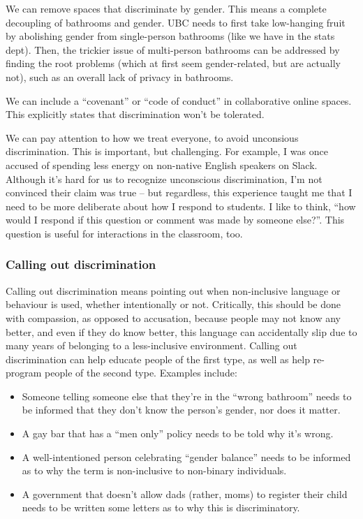 \documentclass[]{article}
\providecommand{\tightlist}{%
  \setlength{\itemsep}{0pt}\setlength{\parskip}{0pt}}
\begin{document}
We can remove spaces that discriminate by gender. This means a complete decoupling of bathrooms and gender. UBC needs to first take low-hanging fruit by abolishing gender from single-person bathrooms (like we have in the stats dept). Then, the trickier issue of multi-person bathrooms can be addressed by finding the root problems (which at first seem gender-related, but are actually not), such as an overall lack of privacy in bathrooms.

We can include a ``covenant'' or ``code of conduct'' in collaborative online spaces. This explicitly states that discrimination won't be tolerated.

We can pay attention to how we treat everyone, to avoid unconsious discrimination. This is important, but challenging. For example, I was once accused of spending less energy on non-native English speakers on Slack. Although it's hard for us to recognize unconscious discrimination, I'm not convinced their claim was true -- but regardless, this experience taught me that I need to be more deliberate about how I respond to students. I like to think, ``how would I respond if this question or comment was made by someone else?''. This question is useful for interactions in the classroom, too.

\hypertarget{calling-out-discrimination}{%
\subsubsection{Calling out discrimination}\label{calling-out-discrimination}}

Calling out discrimination means pointing out when non-inclusive language or behaviour is used, whether intentionally or not. Critically, this should be done with compassion, as opposed to accusation, because people may not know any better, and even if they do know better, this language can accidentally slip due to many years of belonging to a less-inclusive environment. Calling out discrimination can help educate people of the first type, as well as help re-program people of the second type. Examples include:

\begin{itemize}
\tightlist
\item
  Someone telling someone else that they're in the ``wrong bathroom'' needs to be informed that they don't know the person's gender, nor does it matter.
\item
  A gay bar that has a ``men only'' policy needs to be told why it's wrong.
\item
  A well-intentioned person celebrating ``gender balance'' needs to be informed as to why the term is non-inclusive to non-binary individuals.
\item
  A government that doesn't allow dads (rather, moms) to register their child needs to be written some letters as to why this is discriminatory.
\end{itemize}
\end{document}
